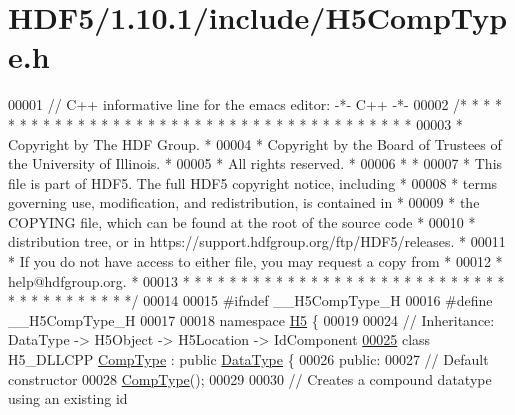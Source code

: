\hypertarget{_h_d_f5_21_810_81_2include_2_h5_comp_type_8h_source}{}\section{H\+D\+F5/1.10.1/include/\+H5\+Comp\+Type.h}
\label{_h_d_f5_21_810_81_2include_2_h5_comp_type_8h_source}

\begin{DoxyCode}
00001 \textcolor{comment}{// C++ informative line for the emacs editor: -*- C++ -*-}
00002 \textcolor{comment}{/* * * * * * * * * * * * * * * * * * * * * * * * * * * * * * * * * * * * * * *}
00003 \textcolor{comment}{ * Copyright by The HDF Group.                                               *}
00004 \textcolor{comment}{ * Copyright by the Board of Trustees of the University of Illinois.         *}
00005 \textcolor{comment}{ * All rights reserved.                                                      *}
00006 \textcolor{comment}{ *                                                                           *}
00007 \textcolor{comment}{ * This file is part of HDF5.  The full HDF5 copyright notice, including     *}
00008 \textcolor{comment}{ * terms governing use, modification, and redistribution, is contained in    *}
00009 \textcolor{comment}{ * the COPYING file, which can be found at the root of the source code       *}
00010 \textcolor{comment}{ * distribution tree, or in https://support.hdfgroup.org/ftp/HDF5/releases.  *}
00011 \textcolor{comment}{ * If you do not have access to either file, you may request a copy from     *}
00012 \textcolor{comment}{ * help@hdfgroup.org.                                                        *}
00013 \textcolor{comment}{ * * * * * * * * * * * * * * * * * * * * * * * * * * * * * * * * * * * * * * */}
00014 
00015 \textcolor{preprocessor}{#ifndef \_\_H5CompType\_H}
00016 \textcolor{preprocessor}{#define \_\_H5CompType\_H}
00017 
00018 \textcolor{keyword}{namespace }\hyperlink{namespace_h5}{H5} \{
00019 
00024 \textcolor{comment}{//  Inheritance: DataType -> H5Object -> H5Location -> IdComponent}
\hyperlink{class_h5_1_1_comp_type}{00025} \textcolor{keyword}{class }H5\_DLLCPP \hyperlink{class_h5_1_1_comp_type}{CompType} : \textcolor{keyword}{public} \hyperlink{class_h5_1_1_data_type}{DataType} \{
00026    \textcolor{keyword}{public}:
00027         \textcolor{comment}{// Default constructor}
00028         \hyperlink{class_h5_1_1_comp_type}{CompType}();
00029 
00030         \textcolor{comment}{// Creates a compound datatype using an existing id}

\end{DoxyCode}
